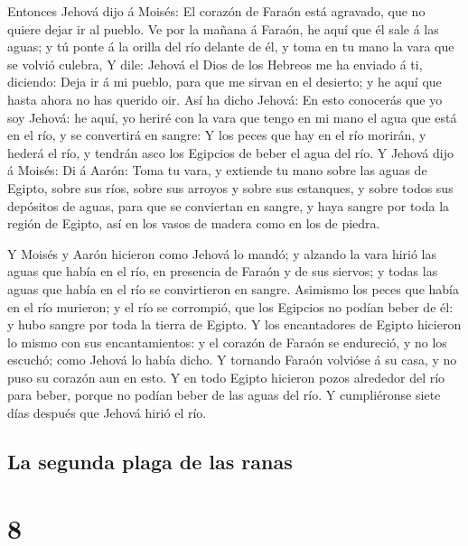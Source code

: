  Entonces Jehová dijo á Moisés: El corazón de Faraón está
agravado, que no quiere dejar ir al pueblo.  Ve por la
mañana á Faraón, he aquí que él sale á las aguas; y tú ponte á la orilla
del río delante de él, y toma en tu mano la vara que se volvió culebra,
 Y dile: Jehová el Dios de los Hebreos me ha enviado á ti,
diciendo: Deja ir á mi pueblo, para que me sirvan en el desierto; y he
aquí que hasta ahora no has querido oir.  Así ha dicho
Jehová: En esto conocerás que yo soy Jehová: he aquí, yo heriré con la
vara que tengo en mi mano el agua que está en el río, y se convertirá en
sangre:  Y los peces que hay en el río morirán, y hederá el
río, y tendrán asco los Egipcios de beber el agua del río. 
Y Jehová dijo á Moisés: Di á Aarón: Toma tu vara, y extiende tu mano
sobre las aguas de Egipto, sobre sus ríos, sobre sus arroyos y sobre sus
estanques, y sobre todos sus depósitos de aguas, para que se conviertan
en sangre, y haya sangre por toda la región de Egipto, así en los vasos
de madera como en los de piedra.

 Y Moisés y Aarón hicieron como Jehová lo mandó; y alzando
la vara hirió las aguas que había en el río, en presencia de Faraón y de
sus siervos; y todas las aguas que había en el río se convirtieron en
sangre.  Asimismo los peces que había en el río murieron; y
el río se corrompió, que los Egipcios no podían beber de él: y hubo
sangre por toda la tierra de Egipto.  Y los encantadores de
Egipto hicieron lo mismo con sus encantamientos: y el corazón de Faraón
se endureció, y no los escuchó; como Jehová lo había dicho.
 Y tornando Faraón volvióse á su casa, y no puso su corazón
aun en esto.  Y en todo Egipto hicieron pozos alrededor del
río para beber, porque no podían beber de las aguas del río.
 Y cumpliéronse siete días después que Jehová hirió el río.

\hypertarget{la-segunda-plaga-de-las-ranas}{%
\subsection{La segunda plaga de las
ranas}\label{la-segunda-plaga-de-las-ranas}}

\hypertarget{section-7}{%
\section{8}\label{section-7}}

